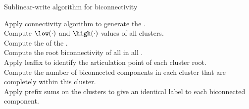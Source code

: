 
\begin{algorithm}[t]
\caption{Sublinear-write algorithm for biconnectivity}
\label{algo:biconn}
\newcommand\mycommfont[1]{\footnotesize{#1}}
    \vspace{0.5em}
    Apply connectivity algorithm to generate the \clustergraph.\\
    Compute $\low(\cdot)$ and $\high(\cdot)$ values of all clusters.\\
    Compute the \imprep{} of the \clustergraph{}.\\
    \smallskip
    Compute the root biconnectivity of all \outvers{} in all .\\
    Apply leaffix to identify the articulation point of each cluster root.\\
    \smallskip
    Compute the number of biconnected components in each cluster that are completely within this cluster.\\
    Apply prefix sums on the clusters to give an identical label to each biconnected component.\\
\end{algorithm}
